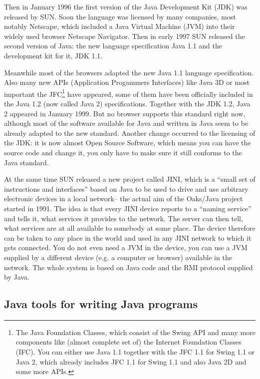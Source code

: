 Then in January 1996 the first version of the Java Development Kit (JDK) 
was released by SUN. Soon the language was licensed by many companies,
most notably Netscape, which included a Java Virtual Machine (JVM) into
their widely used browser Netscape Navigator. Then in early 1997
SUN released the second version of Java: the new language specification 
Java 1.1 and the development kit for it, JDK 1.1.

Meanwhile most of the browsers adapted the new Java 1.1 language specification.
Also many new APIs (Application Progammers Interfaces) like Java 3D or 
most important the JFC\footnote{The Java Foundation Classes, which
consist of the Swing API and many more components like (almost complete set of)  
the Internet Foundation Classes (IFC). You can either use Java 1.1 together
with the JFC 1.1 for Swing 1.1 or Java 2, which already includes JFC 1.1 for
Swing 1.1 and also Java 2D and some more APIs.}
have appeared, some
of them have been officially included in the Java 1.2 (now called Java 2)
specifications. Together with the JDK 1.2, Java 2 appeared in January 1999.
But no browser supports this standard right now, although most
of the software available for Java and written in Java seem to be
already adapted to the new standard. Another change occurred to the
licensing of the JDK: it is now almost Open Source Software, which
means you can have the source code and change it, you only have to make
sure it still conforms to the Java standard.

At the same time SUN released a new project called JINI, which is
a ``small set of instructions and interfaces'' based on Java to
be used to drive and use arbitrary electronic devices in a local network--
the actual aim of the Oaks/Java project started in 1991. The idea is that every 
JINI device reports to a ``naming service'' and tells it, what services
it provides to the network. The server can then tell, what services are at
all available to somebody at some place. The device therefore can be 
taken to any place in the world and used in any JINI network to which
it gets connected. You do not even need a JVM in the device, you can 
use a JVM supplied by a different device (e.g. a computer or browser) 
available in the network. The whole system is based on Java code and
the RMI protocol supplied by Java.



\subsection{Java tools for writing Java programs}

